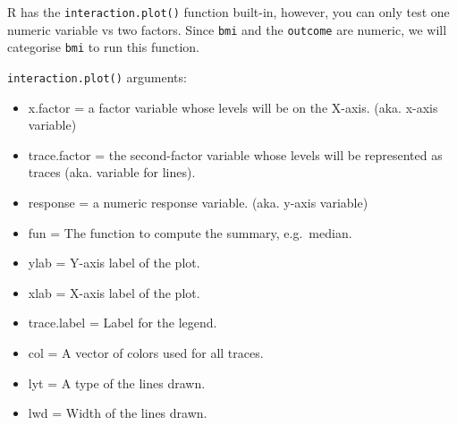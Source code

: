 \documentclass[
]{article}
\newenvironment{Shaded}{\begin{snugshade}}{\end{snugshade}}
\newcommand{\AttributeTok}[1]{\textcolor[rgb]{0.13,0.29,0.53}{#1}}
\newcommand{\CommentTok}[1]{\textcolor[rgb]{0.56,0.35,0.01}{\textit{#1}}}
\newcommand{\DecValTok}[1]{\textcolor[rgb]{0.00,0.00,0.81}{#1}}
\newcommand{\DocumentationTok}[1]{\textcolor[rgb]{0.56,0.35,0.01}{\textbf{\textit{#1}}}}
\newcommand{\FunctionTok}[1]{\textcolor[rgb]{0.13,0.29,0.53}{\textbf{#1}}}
\newcommand{\NormalTok}[1]{#1}
\newcommand{\OtherTok}[1]{\textcolor[rgb]{0.56,0.35,0.01}{#1}}
\newcommand{\SpecialCharTok}[1]{\textcolor[rgb]{0.81,0.36,0.00}{\textbf{#1}}}
\newcommand{\StringTok}[1]{\textcolor[rgb]{0.31,0.60,0.02}{#1}}
\providecommand{\tightlist}{%
  \setlength{\itemsep}{0pt}\setlength{\parskip}{0pt}}
\begin{document}
R has the \texttt{interaction.plot()} function built-in, however, you
can only test one numeric variable vs two factors. Since \texttt{bmi}
and the \texttt{outcome} are numeric, we will categorise \texttt{bmi} to
run this function.

\texttt{interaction.plot()} arguments:

\begin{itemize}
\tightlist
\item
  x.factor = a factor variable whose levels will be on the X-axis. (aka.
  x-axis variable)
\item
  trace.factor = the second-factor variable whose levels will be
  represented as traces (aka. variable for lines).
\item
  response = a numeric response variable. (aka. y-axis variable)
\item
  fun = The function to compute the summary, e.g.~median.
\item
  ylab = Y-axis label of the plot.
\item
  xlab = X-axis label of the plot.
\item
  trace.label = Label for the legend.
\item
  col = A vector of colors used for all traces.
\item
  lyt = A type of the lines drawn.
\item
  lwd = Width of the lines drawn.
\end{itemize}

\begin{Shaded}
\end{Shaded}

\begin{Shaded}
\end{Shaded}
\end{document}
